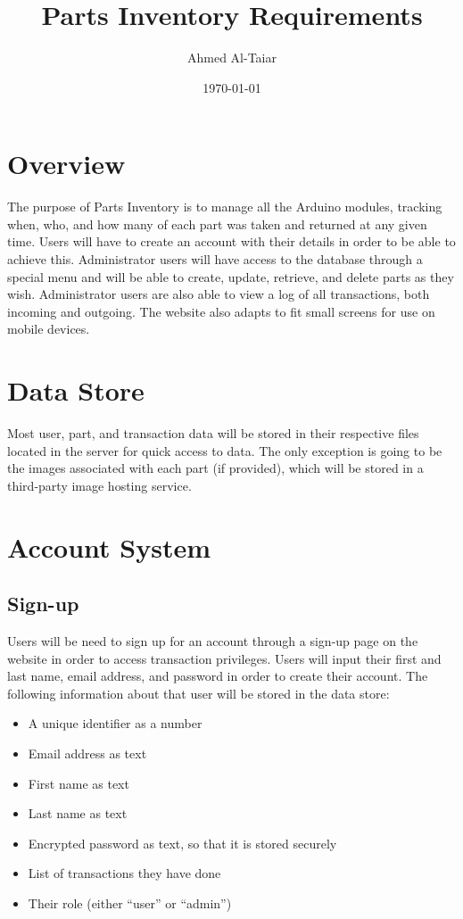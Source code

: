 \documentclass[12pt, letterpaper]{article}
\title{Parts Inventory Requirements}
\author{Ahmed Al-Taiar}
\date{\today}
\begin{document}
\maketitle

\section{Overview}
The purpose of Parts Inventory is to manage all the Arduino modules, tracking when, who, and how many of each part was taken and returned at any given time. Users will have to create an account with their details in order to be able to achieve this. Administrator users will have access to the database through a special menu and will be able to create, update, retrieve, and delete parts as they wish. Administrator users are also able to view a log of all transactions, both incoming and outgoing. The website also adapts to fit small screens for use on mobile devices.

\section{Data Store}
Most user, part, and transaction data will be stored in their respective files located in the server for quick access to data. The only exception is going to be the images associated with each part (if provided), which will be stored in a third-party image hosting service.

\section{Account System}

\subsection{Sign-up}
Users will be need to sign up for an account through a sign-up page on the website in order to access transaction privileges. Users will input their first and last name, email address, and password in order to create their account. The following information about that user will be stored in the data store:

\begin{itemize}
  \item A unique identifier as a number
  \item Email address as text
  \item First name as text
  \item Last name as text
  \item Encrypted password as text, so that it is stored securely
  \item List of transactions they have done
  \item Their role (either ``user'' or ``admin'')
\end{itemize}
\end{document}
